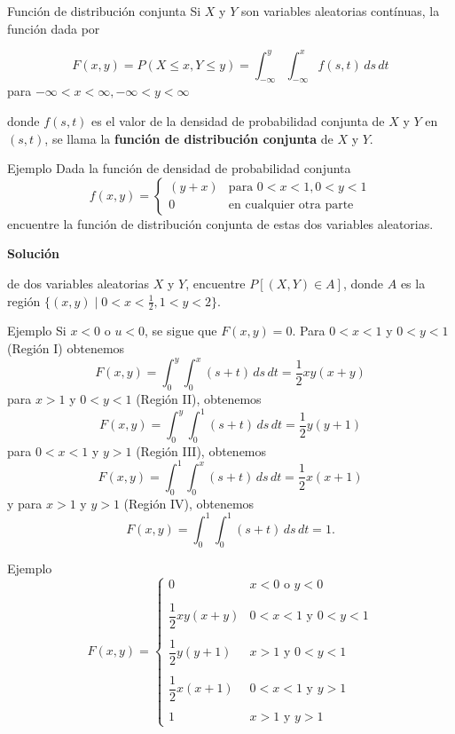 \documentclass[11pt]{beamer}
\begin{document}
\begin{frame}{Función de distribución conjunta}
Si  $X$ y $Y$ son variables aleatorias contínuas, la función dada por 

$$F(x,y)=P(X\le x,Y \le y)= \int_{-\infty}^{y} \int_{- \infty}^{x} {f(s,t) \, ds    \, dt }$$ para $ -\infty < x < \infty , -\infty < y < \infty $

donde $f(s,t)$ es el valor de la densidad de probabilidad conjunta de $X$ y $Y$ en $(s,t)$, se llama la {\bf función de distribución conjunta } de $X$ y $Y$.
\end{frame}


\begin{frame}{Ejemplo}
Dada la función de densidad de probabilidad conjunta
$$ f(x,y) =\left\{ \begin {matrix} 
(y+x) & \mbox{para } 0<x<1,0<y<1 \\ 
0 & \mbox{en cualquier otra parte}
\end{matrix} \right . $$
encuentre la función de distribución conjunta de estas dos variables aleatorias.

{\bf Solución}

de dos variables aleatorias $X$ y $Y$, encuentre $P[(X,Y) \in A]$, donde $A$ es la región $\{(x,y) \mid 0<x<\frac{1}{2}, 1<y<2\}$.
\end{frame}

\begin{frame}{Ejemplo}
Si $x<0$ o $u<0$, se sigue que $F(x,y)=0$. Para $0<x<1$ y $0<y<1$ (Región I) obtenemos 
$$ F(x,y)=\int_{0}^{y} \int_{0}^{x} {(s+t) \, ds    \, dt } = \frac{1}{2}xy(x+y) $$ para $x>1$ y $0<y<1$ (Región II), obtenemos  
$$ F(x,y)=\int_{0}^{y} \int_{0}^{1} {(s+t) \, ds    \, dt } = \frac{1}{2}y(y+1) $$ para 
$0<x<1$ y $y>1$ (Región III), obtenemos  
$$ F(x,y)=\int_{0}^{1} \int_{0}^{x} {(s+t) \, ds    \, dt } = \frac{1}{2}x(x+1) $$ y para
$x>1$ y $y>1$ (Región IV), obtenemos  
$$ F(x,y)=\int_{0}^{1} \int_{0}^{1} {(s+t) \, ds    \, dt } = 1. $$

\end{frame}
\begin{frame}{Ejemplo}
$$F(x,y)=\left\{ \begin{matrix}
 0 & x<0 \mbox{ o } y<0 \\ \\
 \dfrac{1}{2}xy(x+y)  & 0<x<1 \mbox{ y } 0<y<1 \\ \\
 \dfrac{1}{2}y(y+1) & x>1 \mbox{ y } 0<y<1 \\ \\
  \dfrac{1}{2}x(x+1)  &  0<x<1\mbox{ y } y>1  \\ \\
  1 &  x>1 \mbox{ y } y>1
  \end{matrix} \right .$$

\end{frame}
\end{document}

